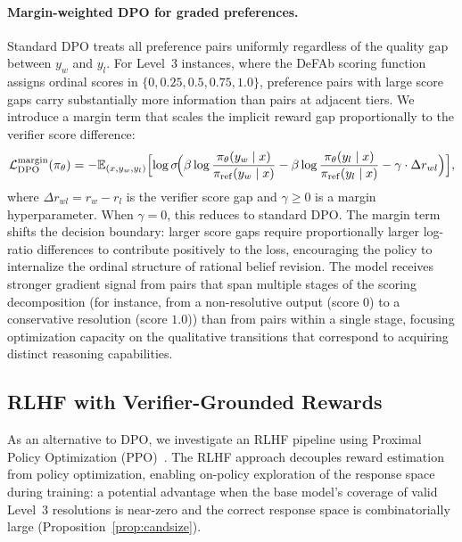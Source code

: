 \documentclass{article}
\theoremstyle{definition}
\begin{document}
\paragraph{Margin-weighted DPO for graded preferences.} Standard DPO treats all preference pairs uniformly regardless of the quality gap between $y_w$ and $y_l$. For Level~3 instances, where the DeFAb scoring function assigns ordinal scores in $\{0, 0.25, 0.5, 0.75, 1.0\}$, preference pairs with large score gaps carry substantially more information than pairs at adjacent tiers. We introduce a margin term that scales the implicit reward gap proportionally to the verifier score difference:
\begin{equation}\label{eq:graded_dpo}
    \mathcal{L}_{\mathrm{DPO}}^{\mathrm{margin}}(\pi_\theta) = -\mathbb{E}_{(x, y_w, y_l)} \Bigl[ \log \sigma\!\Bigl(\beta \log \frac{\pi_\theta(y_w \mid x)}{\pi_{\mathrm{ref}}(y_w \mid x)} - \beta \log \frac{\pi_\theta(y_l \mid x)}{\pi_{\mathrm{ref}}(y_l \mid x)} - \gamma \cdot \Delta r_{wl}\Bigr) \Bigr],
\end{equation}
where $\Delta r_{wl} = r_w - r_l$ is the verifier score gap and $\gamma \geq 0$ is a margin hyperparameter. When $\gamma = 0$, this reduces to standard DPO. The margin term shifts the decision boundary: larger score gaps require proportionally larger log-ratio differences to contribute positively to the loss, encouraging the policy to internalize the ordinal structure of rational belief revision. The model receives stronger gradient signal from pairs that span multiple stages of the scoring decomposition (for instance, from a non-resolutive output (score $0$) to a conservative resolution (score $1.0$)) than from pairs within a single stage, focusing optimization capacity on the qualitative transitions that correspond to acquiring distinct reasoning capabilities.


\subsection{RLHF with Verifier-Grounded Rewards}\label{subsec:rlhf}

As an alternative to DPO, we investigate an RLHF pipeline using Proximal Policy Optimization (PPO)~\cite{schulman2017proximal}. The RLHF approach decouples reward estimation from policy optimization, enabling on-policy exploration of the response space during training: a potential advantage when the base model's coverage of valid Level~3 resolutions is near-zero and the correct response space is combinatorially large (Proposition~\ref{prop:candsize}).
\end{document}
